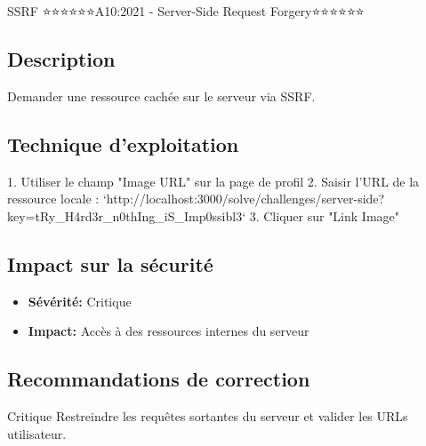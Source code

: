 \begin{vulnerability}{SSRF ⭐⭐⭐⭐⭐⭐}{A10:2021 - Server-Side Request Forgery}{⭐⭐⭐⭐⭐⭐}
    \subsection*{Description}
    Demander une ressource cachée sur le serveur via SSRF.
    
    \subsection*{Technique d'exploitation}
    1. Utiliser le champ "Image URL" sur la page de profil
    2. Saisir l'URL de la ressource locale : `http://localhost:3000/solve/challenges/server-side?key=tRy_H4rd3r_n0thIng_iS_Imp0ssibl3`
    3. Cliquer sur "Link Image"
    
    \subsection*{Impact sur la sécurité}
    \begin{itemize}
        \item \textbf{Sévérité:} Critique
        \item \textbf{Impact:} Accès à des ressources internes du serveur
    \end{itemize}
    
    \subsection*{Recommandations de correction}
    \begin{recommendation}{Critique}
        Restreindre les requêtes sortantes du serveur et valider les URLs utilisateur.
    \end{recommendation}
\end{vulnerability}

